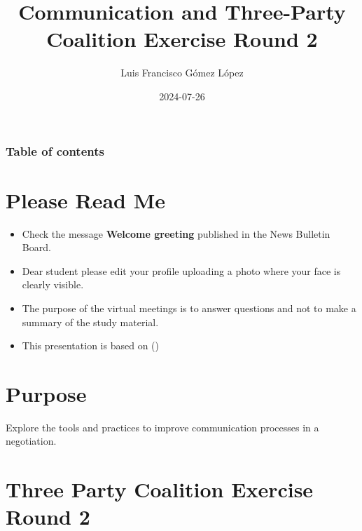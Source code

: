 \documentclass[
  ignorenonframetext,
]{beamer}
\title{Communication and Three-Party Coalition Exercise Round 2}
\author{Luis Francisco Gómez López}
\date{2024-07-26}
\institute{FAEDIS}
\renewcommand*\contentsname{Table of contents}
\newcommand\contentsname{Table of contents}
\begin{document}
\frame{\titlepage}

\renewcommand*\contentsname{Table of contents}
\begin{frame}[allowframebreaks]
  \frametitle{Table of contents}
  \tableofcontents[hideallsubsections]
\end{frame}

\section{Please Read Me}\label{please-read-me}

\begin{frame}{}
\label{section}
\begin{itemize}
\item
  Check the message \textbf{Welcome greeting} published in the News
  Bulletin Board.
\item
  Dear student please edit your profile uploading a photo where your
  face is clearly visible.
\item
  The purpose of the virtual meetings is to answer questions and not to
  make a summary of the study material.
\item
  This presentation is based on
  ()
\end{itemize}
\end{frame}

\section{Purpose}\label{purpose}

\begin{frame}{}
\label{section-1}
Explore the tools and practices to improve communication processes in a
negotiation.
\end{frame}

\section{Three Party Coalition Exercise Round
2}\label{three-party-coalition-exercise-round-2}
\end{document}
